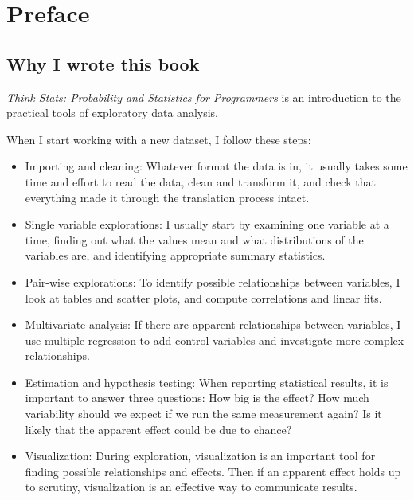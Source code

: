 \documentclass[12pt]{book}
\begin{document}
\fi

\chapter{Preface}
\label{preface}

\section*{Why I wrote this book}

{\em Think Stats: Probability and Statistics for Programmers} is an
introduction to the practical tools of exploratory data analysis.

When I start working with a new dataset, I follow these steps:

\begin{itemize}

\item Importing and cleaning: Whatever format the data is in, it
usually takes some time and effort to read the data, clean and transform
it, and check that everything made it through the translation process
intact.

\item Single variable explorations: I usually start by examining one
  variable at a time, finding out what the values mean and what
  distributions of the variables are, and identifying appropriate
  summary statistics.

\item Pair-wise explorations: To identify possible relationships
  between variables, I look at tables and scatter plots, and compute
  correlations and linear fits.

\item Multivariate analysis: If there are apparent relationships
  between variables, I use multiple regression to add control variables
  and investigate more complex relationships.

\item Estimation and hypothesis testing: When reporting statistical
  results, it is important to answer three questions: How big is
  the effect?  How much variability should we expect if we run the same
  measurement again?  Is it likely that the apparent effect could be
  due to chance?

\item Visualization: During exploration, visualization is an important 
  tool for finding possible relationships and effects.  Then if an
  apparent effect holds up to scrutiny, visualization is an effective
  way to communicate results.

\end{itemize}
\end{document}
